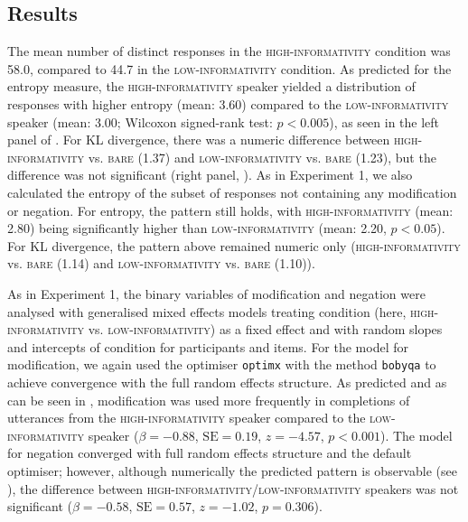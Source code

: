 \documentclass[output=paper,colorlinks,citecolor=brown]{langscibook}
\begin{document}
\subsection{Results}

The mean number of distinct responses in the \textsc{high-informativity} condition was 58.0, compared to 44.7 in the \textsc{low-informativity} condition. As predicted for the entropy measure, the \textsc{high-informativity} speaker yielded a distribution of responses with higher entropy (mean: 3.60) compared to the \textsc{low-informativity} speaker (mean: 3.00; Wilcoxon signed-rank test: $p < 0.005$), as seen in the left panel of . For KL divergence, there was a numeric difference between \textsc{high-informativity} vs. \textsc{bare} (1.37) and \textsc{low-informativity} vs. \textsc{bare} (1.23), but the difference was not significant (right panel, ). As in Experiment 1, we also calculated the entropy of the subset of responses not containing any modification or negation. For entropy, the pattern still holds, with \textsc{high-informativity} (mean: 2.80) being significantly higher than \textsc{low-informativity} (mean: 2.20, $p < 0.05$). For KL divergence, the pattern above remained numeric only (\textsc{high-informativity} vs. \textsc{bare} (1.14) and \textsc{low-informativity} vs. \textsc{bare} (1.10)).
 
As in Experiment 1, the binary variables of modification and negation were analysed with generalised mixed effects models treating condition (here, \textsc{high-informativity} vs. \textsc{low-informativity}) as a fixed effect and with random slopes and intercepts of condition for participants and items. For the model for modification, we again used the optimiser \texttt{optimx} with the method \texttt{bobyqa} to achieve convergence with the full random effects structure. As predicted and as can be seen in , modification was used more frequently in completions of utterances from the \textsc{high-informativity} speaker compared to the \textsc{low-informativity} speaker ($\beta = -0.88$, $\text{SE} = 0.19$, $z = -4.57$, $p < 0.001$). The model for negation converged with full random effects structure and the default optimiser; however, although numerically the predicted pattern is observable (see ), the difference between \textsc{high-informativity}/\textsc{low-informativity} speakers was not significant ($\beta = -0.58$, $\text{SE} = 0.57$, $z = -1.02$, $p = 0.306$).
 
\end{document}
